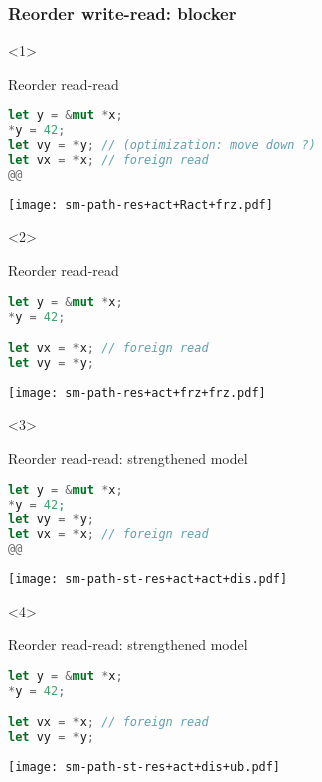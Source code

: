 \begin{frame}[fragile, t]
    \frametitle{Reorder write-read: blocker}
    \begin{onlyenv}<1>
        \begin{block}{{\cmark} Reorder read-read}
            \begin{lstlisting}[language=rust, escapechar=@]
let y = &mut *x;
*y = 42;
let vy = *y; // (optimization: move down ?)
let vx = *x; // foreign read
@@
            \end{lstlisting}
        \end{block}
        \texttt{[image: sm-path-res+act+Ract+frz.pdf]}
    \end{onlyenv}

    \begin{onlyenv}<2>
        \begin{block}{{\cmark} Reorder read-read}
            \begin{lstlisting}[language=rust]
let y = &mut *x;
*y = 42;

let vx = *x; // foreign read
let vy = *y;
            \end{lstlisting}
        \end{block}
        \texttt{[image: sm-path-res+act+frz+frz.pdf]}
    \end{onlyenv}

    \begin{onlyenv}<3>
        \begin{block}{{\xmark} Reorder read-read: strengthened model}
            \begin{lstlisting}[language=rust, escapechar=@]
let y = &mut *x;
*y = 42;
let vy = *y;
let vx = *x; // foreign read
@@
            \end{lstlisting}
        \end{block}
        \texttt{[image: sm-path-st-res+act+act+dis.pdf]}
    \end{onlyenv}

    \begin{onlyenv}<4>
        \begin{block}{{\xmark} Reorder read-read: strengthened model}
            \begin{lstlisting}[language=rust]
let y = &mut *x;
*y = 42;

let vx = *x; // foreign read
let vy = *y;
            \end{lstlisting}
        \end{block}
        \texttt{[image: sm-path-st-res+act+dis+ub.pdf]}
    \end{onlyenv}
\end{frame}

